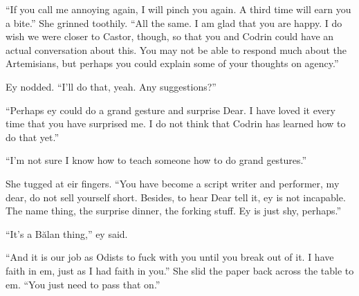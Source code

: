 ``If you call me annoying again, I will pinch you again. A third time will earn you a bite.'' She grinned toothily. ``All the same. I am glad that you are happy. I do wish we were closer to Castor, though, so that you and Codrin could have an actual conversation about this. You may not be able to respond much about the Artemisians, but perhaps you could explain some of your thoughts on agency.''

Ey nodded. ``I'll do that, yeah. Any suggestions?''

``Perhaps ey could do a grand gesture and surprise Dear. I have loved it every time that you have surprised me. I do not think that Codrin has learned how to do that yet.''

``I'm not sure I know how to teach someone how to do grand gestures.''

She tugged at eir fingers. ``You have become a script writer and performer, my dear, do not sell yourself short. Besides, to hear Dear tell it, ey is not incapable. The name thing, the surprise dinner, the forking stuff. Ey is just shy, perhaps.''

``It's a Bălan thing,'' ey said.

``And it is our job as Odists to fuck with you until you break out of it. I have faith in em, just as I had faith in you.'' She slid the paper back across the table to em. ``You just need to pass that on.''
